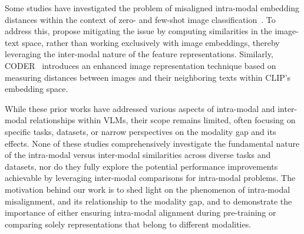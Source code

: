 Some studies have investigated the problem of misaligned intra-modal embedding distances within the context of zero- and few-shot image classification~\citep{udandarao2023sus, yi2024leveraging}. To address this, \citet{udandarao2023sus} propose mitigating the issue by computing similarities in the image-text space, rather than working exclusively with image embeddings, thereby leveraging the inter-modal nature of the feature representations. Similarly, CODER~\citep{yi2024leveraging} introduces an enhanced image representation technique based on measuring distances between images and their neighboring texts within CLIP's embedding space. 

While these prior works have addressed various aspects of intra-modal and inter-modal relationships within VLMs, their scope remains limited, often focusing on specific tasks, datasets, or narrow perspectives on the modality gap and its effects. None of these studies comprehensively investigate the fundamental nature of the intra-modal versus inter-modal similarities across diverse tasks and datasets, nor do they fully explore the potential performance improvements achievable by leveraging inter-modal comparisons for intra-modal problems. The motivation behind our work is to shed light on the phenomenon of intra-modal misalignment, and its relationship to the modality gap, and to demonstrate the importance of either ensuring intra-modal alignment during pre-training or comparing solely representations that belong to different modalities.